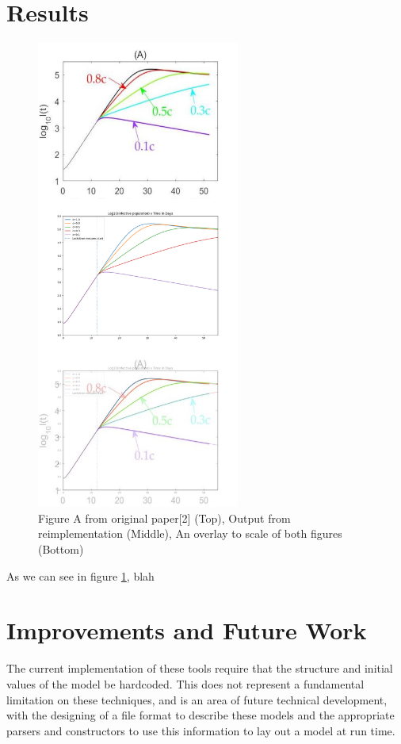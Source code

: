 \documentclass[twocolumn]{article}
\begin{document}
\section{Results}
\FloatBarrier

\begin{figure}[h!]
	\begin{center}
		\includegraphics[width=18em]{figure_a_overlay.png}
		\caption{Figure A from original paper[2] (Top), Output from reimplementation (Middle), An overlay to scale of both figures (Bottom)}
		\label{fig:overlay}
	\end{center}
\end{figure}

As we can see in figure \ref{fig:overlay}, blah

\FloatBarrier
\section{Improvements and Future Work}

The current implementation of these tools require that the structure and initial values of the model be hardcoded. This does not represent a fundamental limitation on these techniques, and is an area of future technical development, with the designing of a file format to describe these models and the appropriate parsers and constructors to use this information to lay out a model at run time. 
\end{document}
